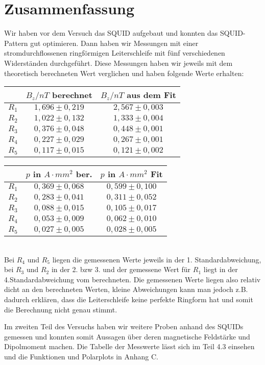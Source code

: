 \section{Zusammenfassung}

Wir haben vor dem Versuch das SQUID aufgebaut und konnten das SQUID-Pattern gut optimieren. Dann haben wir Messungen mit einer stromdurchflossenen ringförmigen Leiterschleife mit fünf verschiedenen Widerständen durchgeführt. Diese Messungen haben wir jeweils mit dem theoretisch berechneten Wert verglichen und haben folgende Werte erhalten:\\

\begin{minipage}{0.5\textwidth}
\begin{center}
\begin{tabular}[H]{| c | c | c |} \hline
 & $B_z / nT$ berechnet & $B_z / nT$ aus dem Fit\\ \hline \hline
 $R_1$ & $1,696 \pm 0,219$ & $2,567\pm 0,003$\\
 $R_2$ & $1,022 \pm 0,132$ & $1,333\pm 0,004$\\
 $R_3$ & $0,376 \pm 0,048$ & $0,448\pm 0,001$\\
 $R_4$ & $0,227 \pm 0,029$ & $0,267\pm 0,001$\\
 $R_5$ & $0,117 \pm 0,015$ & $0,121\pm 0,002$\\ \hline
 \end{tabular}
 \end{center}
 \end{minipage} 
\begin{minipage}{0.5\textwidth}
\begin{center}
\begin{tabular}[H]{| c | c | c |} \hline
 & $p$ in $A\cdot mm^2$ ber. & $p$ in $A\cdot mm^2$ Fit\\ \hline \hline
 $R_1$ & $0,369 \pm 0,068$ & $0,599\pm 0,100$\\
 $R_2$ & $0,283 \pm 0,041$ & $0,311\pm 0,052$\\
 $R_3$ & $0,088 \pm 0,015$ & $0,105\pm 0,017$\\
 $R_4$ & $0,053 \pm 0,009$ & $0,062\pm 0,010$\\
 $R_5$ & $0,027 \pm 0,005$ & $0,028\pm 0,005$\\ \hline
 \end{tabular}
 \end{center}
 \end{minipage}\\
 
 Bei $R_4$ und $R_5$ liegen die gemessenen Werte jeweils in der 1. Standardabweichung, bei $R_3$ und $R_2$ in der 2. bzw 3. und der gemessene Wert für $R_1$ liegt in der 4.Standardabweichung vom berechneten. Die gemessenen Werte liegen also relativ dicht an den berechneten Werten, kleine Abweichungen kann man jedoch z.B. dadurch erklären, dass die Leiterschleife keine perfekte Ringform hat und somit die Berechnung nicht genau stimmt.
 
Im zweiten Teil des Versuchs haben wir weitere Proben anhand des SQUIDs gemessen und konnten somit Aussagen über deren magnetische Feldstärke und Dipolmoment machen. Die Tabelle der Messwerte lässt sich im Teil 4.3 einsehen und die Funktionen und Polarplots in Anhang C.